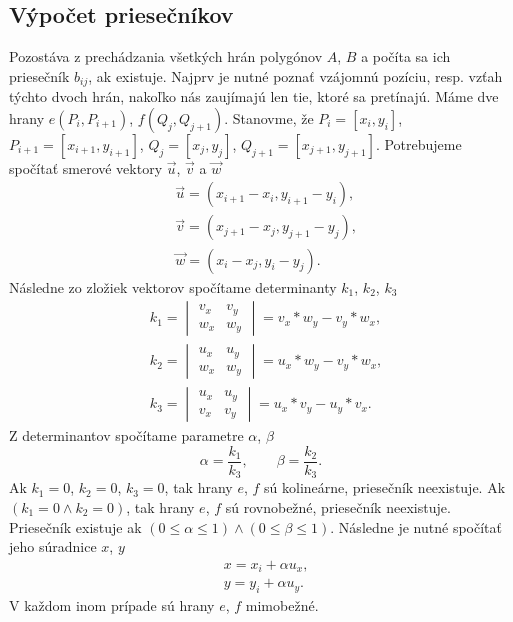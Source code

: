 \documentclass[11pt]{article}
\begin{document}
\subsection{Výpočet priesečníkov}\label{vyp_pries}
Pozostáva z prechádzania všetkých hrán polygónov $A$, $B$ a počíta sa ich priesečník $b_{ij}$, ak existuje. Najprv je nutné poznať vzájomnú pozíciu, resp. vzťah týchto dvoch hrán, nakoľko nás zaujímajú len tie, ktoré sa pretínajú. Máme dve hrany $e(P_i, P_{i+1})$, $f(Q_j, Q_{j+1})$. Stanovme, že $P_i=[x_i, y_i]$, $P_{i+1}=[x_{i+1}, y_{i+1}]$, $Q_j=[x_j, y_j]$, $Q_{j+1}=[x_{j+1}, y_{j+1}]$. Potrebujeme spočítať smerové vektory \linebreak $\vec{u}$, $\vec{v}$ a $\vec{w}$
\begin{align}
    \nonumber&\vec{u}=(x_{i+1}-x_i, y_{i+1}-y_i),\\
    \nonumber&\vec{v}=(x_{j+1}-x_j, y_{j+1}-y_j),\\
    \nonumber&\vec{w}=(x_i-x_j, y_i-y_j).
\end{align}
Následne zo zložiek vektorov spočítame determinanty $k_1$, $k_2$, $k_3$
\begin{align}
\nonumber& k_1=\begin{vmatrix} v_x & v_y \\ w_x & w_y  \end{vmatrix}=v_x*w_y - v_y*w_x,\\
\nonumber& k_2=\begin{vmatrix} u_x & u_y \\ w_x & w_y  \end{vmatrix}=u_x*w_y - v_y*w_x,\\
\nonumber& k_3=\begin{vmatrix} u_x & u_y \\ v_x & v_y  \end{vmatrix}=u_x*v_y - u_y*v_x.
\end{align}
Z determinantov spočítame parametre $\alpha$, $\beta$
\begin{equation*}
\alpha=\frac{k_1}{k_3}, \quad \quad \beta=\frac{k_2}{k_3}.
\end{equation*}
Ak $k_1 = 0$, $k_2=0$, $k_3=0$, tak hrany $e$, $f$ sú kolineárne, priesečník neexistuje. \newline
Ak $(k_1=0 \land k_2=0)$, tak hrany $e$, $f$ sú rovnobežné, priesečník neexistuje. \newline 
Priesečník existuje ak $(0 \leq \alpha \leq 1) \land (0 \leq \beta \leq 1)$. Následne je nutné spočítať jeho súradnice $x$, $y$
\begin{align}
\nonumber &x = x_i + \alpha u_x,\\
\nonumber &y = y_i + \alpha u_y.
\end{align}
V každom inom prípade sú hrany $e$, $f$ mimobežné.
\end{document}
